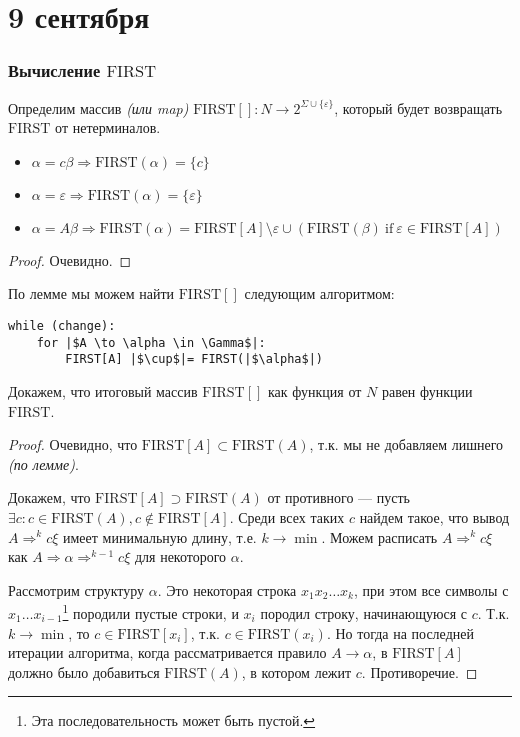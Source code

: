 \chapter{9 сентября}

\subsection{Вычисление \(\mathrm{FIRST}\)}

Определим массив \textit{(или map)} \(\mathrm{FIRST[]} : N \to 2^{\Sigma \cup \{\varepsilon\}}\), который будет возвращать \(\mathrm{FIRST}\) от нетерминалов.

\begin{lemma}\itemfix
    \begin{itemize}
        \item \(\alpha = c\beta \Rightarrow \mathrm{FIRST}(\alpha) = \{c\}\)
        \item \(\alpha = \varepsilon \Rightarrow \mathrm{FIRST}(\alpha) = \{\varepsilon\}\)
        \item \(\alpha = A\beta \Rightarrow \mathrm{FIRST}(\alpha) = \mathrm{FIRST}[A] \setminus \varepsilon \cup (\mathrm{FIRST}(\beta)\ \mathrm{if}\ \varepsilon \in \mathrm{FIRST}[A])\)
    \end{itemize}
\end{lemma}
\begin{proof}
    Очевидно.
\end{proof}

По лемме мы можем найти \(\mathrm{FIRST}[]\) следующим алгоритмом:

\begin{verbatim}
while (change):
    for |$A \to \alpha \in \Gamma$|:
        FIRST[A] |$\cup$|= FIRST(|$\alpha$|)
\end{verbatim}

Докажем, что итоговый массив \(\mathrm{FIRST}[]\) как функция от \(N\) равен функции \(\mathrm{FIRST}\).
\begin{proof}
    Очевидно, что \(\mathrm{FIRST}[A] \subset \mathrm{FIRST}(A)\), т.к. мы не добавляем лишнего \textit{(по лемме)}.

    Докажем, что \(\mathrm{FIRST}[A] \supset \mathrm{FIRST}(A)\) от противного --- пусть \(\exists c : c \in \mathrm{FIRST}(A), c \notin \mathrm{FIRST}[A]\). Среди всех таких \(c\) найдем такое, что вывод \(A \Rightarrow^k c\xi\) имеет минимальную длину, т.е. \(k \to \min\). Можем расписать \(A \Rightarrow^k c\xi\) как \(A \Rightarrow \alpha \Rightarrow^{k - 1} c\xi\) для некоторого \(\alpha\).

    Рассмотрим структуру \(\alpha\). Это некоторая строка \(x_1 x_2 \dots x_k\), при этом все символы с \(x_1\dots x_{i - 1}\)\footnote{Эта последовательность может быть пустой.} породили пустые строки, и \(x_i\) породил строку, начинающуюся с \(c\). Т.к. \(k \to \min\), то \(c \in \mathrm{FIRST}[x_i]\), т.к. \(c \in \mathrm{FIRST}(x_i)\). Но тогда на последней итерации алгоритма, когда рассматривается правило \(A \to \alpha\), в \(\mathrm{FIRST}[A]\) должно было добавиться \(\mathrm{FIRST}(A)\), в котором лежит \(c\). Противоречие.
\end{proof}

